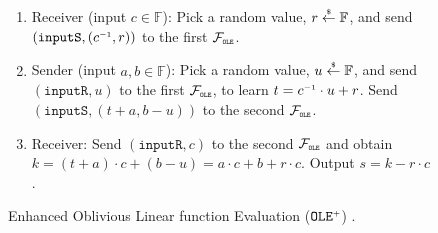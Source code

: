 \begin{figure}[ht]
\setlength{\fboxsep}{1pt}
\begin{center}
\begin{boxedminipage}{12.3cm}
\begin{small}
\begin{enumerate}
%
\item  Receiver (input $c \in \mathbb{F} $): Pick a random value, $r\stackrel{\scriptscriptstyle\$}\leftarrow  \mathbb{F} $, and send  $(\mathtt{inputS}, (c^{\scriptscriptstyle -1}, r))$ to the first $\mathcal{F}_{\scriptscriptstyle\mathtt{OLE}}$.
%
%
\item Sender (input $a, b \in \mathbb{F} $): Pick a random value, $u \stackrel{\scriptscriptstyle\$}\leftarrow  \mathbb{F} $, and send $(\mathtt{inputR}, u)$ to the first $\mathcal{F}_{\scriptscriptstyle\mathtt{OLE}}$, to learn $t =  c^{\scriptscriptstyle -1}\cdot u
 + r$. Send $(\mathtt{inputS},(t + a, b - u))$ to the second $\mathcal{F}_{\scriptscriptstyle\mathtt{OLE}}$.
%
\item Receiver: Send $(\mathtt{inputR}, c)$ to the second $\mathcal{F}_{\scriptscriptstyle\mathtt{OLE}}$ and obtain $k = (t+a)\cdot c+(b-u)=a\cdot c + b + r\cdot c$. Output $s=k - r\cdot c$.

\end{enumerate}
\end{small}
\end{boxedminipage}
\end{center}
\caption{
\small {Enhanced Oblivious Linear function Evaluation  ($\mathtt{OLE}^{\scriptscriptstyle +}$)  \cite{GhoshN19}}.} 
\label{fig:OLE-plus-protocol}
\end{figure}
